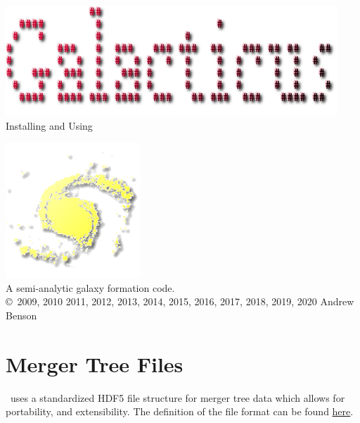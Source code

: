 \documentclass[letterpaper,10pt,headsepline]{scrbook}
\begin{document}
\lstset{language=[95]Fortran}

\frontmatter

\pagestyle{empty}
\begin{center}
\includegraphics[width=125mm]{GalacticusLogo.png}\\

\Huge Installing and Using \normalsize

\includegraphics{New_Logo_Galaxy_192_Transparent.png}\\
A semi-analytic galaxy formation code.\\

\copyright\ 2009, 2010 2011, 2012, 2013, 2014, 2015, 2016, 2017, 2018, 2019, 2020 Andrew Benson
\end{center}

\tableofcontents

\mainmatter
\pagestyle{headings}
















\backmatter

\appendix

\chapter{Merger Tree Files}

\glc\ uses a standardized HDF5 file structure for merger tree data which allows for portability, and extensibility. The definition of the file format can be found \href{https://github.com/galacticusorg/galacticus/wiki/Merger-Tree-File-Format}{here}.










\printglossaries

\citeindextrue
\printindex
\end{document}
